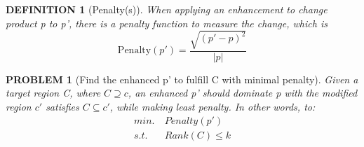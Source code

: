 \documentclass{IEEEtran}%
\newtheorem{definition}{D\scriptsize EFINITION}
\newtheorem{problem}{P\scriptsize ROBLEM}
\begin{document}
	\begin{definition}[Penalty(s)]
		When applying an enhancement to change product p to p', there is a penalty function to measure the change, which is 
		\[\text{Penalty}(p') = \frac{\sqrt{(p'-p)^2}}{|p|}\]
	\end{definition}
	
	\begin{problem}[Find the enhanced p' to fulfill C with minimal penalty]
        Given a target region C, where $C \supseteq c $, an enhanced p' should dominate p with the modified region $c'$ satisfies $C \subseteq c'$, while making least penalty. In other words, to:
        \begin{align*}
       min. \   &Penalty(p')\\
        s.t.    \ &Rank(C) \le k 
        \end{align*}
	\end{problem}
\end{document}
